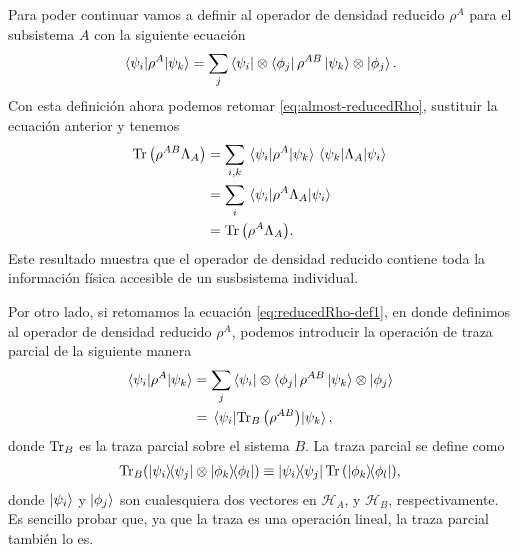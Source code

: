 Para poder continuar vamos a definir al operador de densidad
reducido $\rho^A$ para el subsistema $A$ con la siguiente ecuación
\cite{chandra2013quantum}
\begin{align}
	\matrixel{\psi_i}{\rho^A}{\psi_k} = 
	\sum _j \bra{\psi_i}\ten\bra{\phi_j}\rho^{AB}\ket{\psi_k}\ten\ket{\phi_j}.
	\label{eq:reducedRho-def1}
\end{align}
Con esta definición ahora podemos retomar  \eqref{eq:almost-reducedRho},
sustituir la ecuación anterior y tenemos
\begin{align}
	\Tr \qty(\rho^{AB}\Lambda_A)&= \sum _{i,k}
	\matrixel{\psi_i}{\rho^A}{\psi_k} \matrixel{\psi_k}{\Lambda_A}{\psi_i}\\
	&= \sum_i \matrixel{\psi_i}{\rho^A\Lambda_A}{\psi_i}\\
	&= \Tr \qty(\rho^A\Lambda_A). \label{eq:reduced-works}
\end{align}
Este resultado muestra que el operador de densidad reducido 
contiene toda la información física accesible de un susbsistema individual.

Por otro lado, si retomamos la ecuación \eqref{eq:reducedRho-def1},
en donde definimos al operador de densidad reducido $\rho^A$, podemos
introducir la operación de traza parcial de la siguiente manera
\begin{align}
	\matrixel{\psi_i}{\rho^A}{\psi_k} &= 
	\sum _j \bra{\psi_i}\ten\bra{\phi_j}\rho^{AB}\ket{\psi_k}\ten\ket{\phi_j}\\
	&=\matrixel{\psi_i}{\Tr_B\qty(\rho^{AB})}{\psi_k},
	\label{eq:partialTrace-def}
\end{align}
donde $\Tr_B$ es la traza parcial sobre el sistema $B$. La traza parcial
se define como \cite{nielsen_chuang_2011}
\begin{align}
	\Tr_B (\dyad{\psi_i}{\psi_j}\otimes \dyad{\phi_k}{\phi_l})
	\equiv
	\dyad{\psi_i}{\psi_j}\Tr \qty(\dyad{\phi_k}{\phi_l}),
	\label{eq:part_trace-def}
\end{align}
donde $\ket{\psi_i}$ y $\ket{\phi_j}$ son cualesquiera dos vectores en
$\mathcal{H}_A$, y $\mathcal{H}_B$, respectivamente. Es sencillo probar
que, ya que la traza es una operación lineal, la traza parcial también 
lo es.


